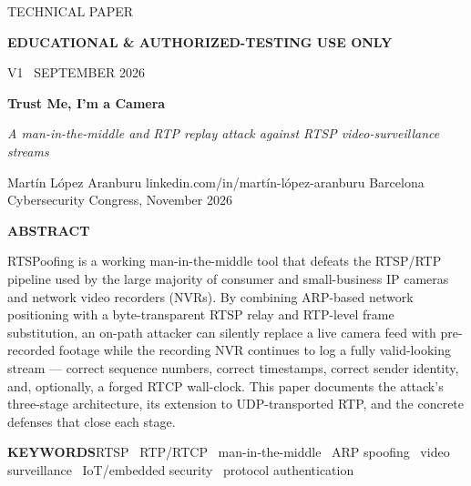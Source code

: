 \documentclass[11pt,a4paper]{article}
\begin{document}
\thispagestyle{empty}

\begin{center}
{\sffamily\footnotesize
 \colorbox{tablehead}{\strut\textcolor{inksoft}{\;TECHNICAL PAPER\;}}\hspace{4pt}%
 \colorbox{accentsoft}{\strut\textcolor{accentink}{\;\bfseries EDUCATIONAL \& AUTHORIZED-TESTING USE ONLY\;}}\hspace{4pt}%
 \colorbox{tablehead}{\strut\textcolor{inksoft}{\;V1 \textperiodcentered\ SEPTEMBER 2026\;}}
}
\end{center}
\vspace{14pt}

{\centering\sffamily\bfseries\fontsize{28}{32}\selectfont Trust Me, I'm a Camera\par}
\vspace{6pt}
{\centering\itshape\large\color{inksoft} A man-in-the-middle and RTP replay attack against RTSP video-surveillance streams\par}
\vspace{12pt}
{\centering\sffamily\small
Mart\'in L\'opez Aranburu \quad\textbullet\quad linkedin.com/in/mart\'in-l\'opez-aranburu \quad\textbullet\quad Barcelona Cybersecurity Congress, November 2026
\par}
\vspace{18pt}

\begin{tcolorbox}[enhanced, colback=white, colframe=linec, boxrule=0.6pt, left=16pt,right=16pt,top=10pt,bottom=10pt]
{\sffamily\bfseries\footnotesize\color{accentink} ABSTRACT}\par\vspace{4pt}
RTSPoofing is a working man-in-the-middle tool that defeats the RTSP/RTP pipeline used by the large majority of consumer and small-business IP cameras and network video recorders (NVRs). By combining ARP-based network positioning with a byte-transparent RTSP relay and RTP-level frame substitution, an on-path attacker can silently replace a live camera feed with pre-recorded footage while the recording NVR continues to log a fully valid-looking stream --- correct sequence numbers, correct timestamps, correct sender identity, and, optionally, a forged RTCP wall-clock. This paper documents the attack's three-stage architecture, its extension to UDP-transported RTP, and the concrete defenses that close each stage.
\par\vspace{8pt}
{\sffamily\bfseries\footnotesize\color{inkfaint} KEYWORDS\;\;}{\footnotesize\color{inksoft}RTSP \textperiodcentered\ RTP/RTCP \textperiodcentered\ man-in-the-middle \textperiodcentered\ ARP spoofing \textperiodcentered\ video surveillance \textperiodcentered\ IoT/embedded security \textperiodcentered\ protocol authentication}
\end{tcolorbox}
\end{document}
